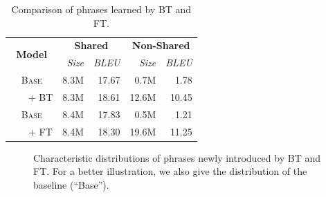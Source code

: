 \documentclass[11pt,a4paper]{article}
\begin{document}
\begin{table}[t]
\begin{center}
 \begin{tabular}{c|r|r||r|r}
  \multirow{2}{*}{\bf Model}  &  \multicolumn{2}{c|}{\bf Shared} &   \multicolumn{2}{c}{\bf Non-Shared} \\
  \cline{2-5}
        & \em Size    &  \em BLEU  & \em  Size   & \em BLEU   \\
  \hline \hline
  \textsc{Base}      & 8.3M  & 17.67  & 0.7M    &  1.78   \\
  ~~~ + BT           & 8.3M  & 18.61  & 12.6M   &  10.45    \\
  \hline \hline
  \textsc{Base}      & 8.4M  & 17.83    & 0.5M  & 1.21 \\
  ~~~ + FT           & 8.4M  & 18.30    & 19.6M & 11.25 \\

 \end{tabular} 
\end{center}
\caption{Comparison of phrases learned by BT and FT.}
\label{table:back_transaltion_shared}
\end{table}


\begin{figure}[t]
    \centering
     \hfill
     \hfill
\caption{Characteristic distributions of phrases newly introduced by BT and FT. For a better illustration, we also give the distribution of the baseline (``Base'').}
\label{fig:back_translation_shared}
\end{figure}
\end{document}
